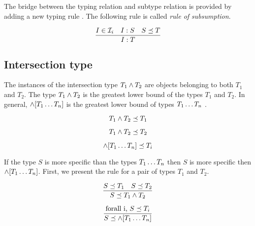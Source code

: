 \documentclass[runningheads]{llncs}
\newcommand{\Ii}{{\cal I}_i}
\begin{document}
\noindent The bridge between the typing relation and subtype relation
is provided by adding a new typing rule \cite{Pierce02TypesProgLang}. The
following rule is called \emph{rule of subsumption}.

\begin{equation}
\dfrac{I\in\Ii \quad I:S \quad S\preceq\/T}
      {I:T}    
\end{equation}


  


\subsection{Intersection type}

The instances of the intersection type $T_1\land\/T_2$ are objects
belonging to both $T_1$ and $T_2$. The type $T_1\land\/T_2$ is the
greatest lower bound of the types $T_1$ and $T_2$. In general,
$\land[T_1\ldots\/T_n]$ is the greatest lower bound of types
$T_1\ldots\/T_n$ \cite{Pierce91IntersectUnion,Pierce96IntersectionTypes}.

\begin{equation}
T_1\land\/T_2\preceq\/T_1    
\end{equation}

\begin{equation}
T_1\land\/T_2\preceq\/T_2  
\end{equation}

\begin{equation}
\land[T_1\ldots\/T_n] \preceq\/T_i  
\end{equation}

If the type $S$ is more specific than the types $T_1\ldots\/T_n$ then
$S$ is more specific then $\land[T_1\ldots\/T_n]$. First, we present
the rule for a pair of types $T_1$ and $T_2$.

\begin{equation}
\dfrac{S\preceq\/T_1\quad\/S\preceq\/\/T_2}
      {S\preceq\/T_1\land\/T_2}  
\end{equation}

\begin{equation}
\dfrac{\text{forall i,\ } S\preceq\/T_i}
      {S\preceq\land[T_1\ldots\/T_n]}  
\end{equation}
\end{document}
